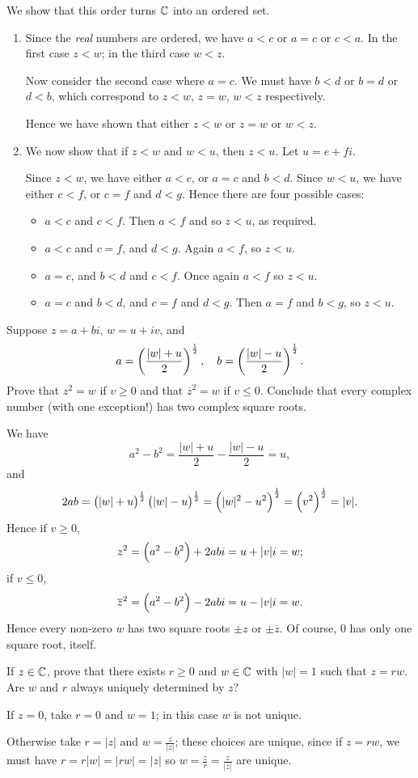 \begin{solution}
We show that this order turns $\mathbb C$ into an ordered set.
\begin{enumerate}[label=(\roman*)]
\item Since the \emph{real} numbers are ordered, we have $a<c$ or $a=c$ or $c<a$. In the first case $z<w$; in the third case $w<z$.

Now consider the second case where $a=c$. We must have $b<d$ or $b=d$ or $d<b$, which correspond to $z<w$, $z=w$, $w<z$ respectively.

Hence we have shown that either $z<w$ or $z=w$ or $w<z$.

\item We now show that if $z<w$ and $w<u$, then $z<u$. Let $u=e+fi$.

Since $z<w$, we have either $a<c$, or $a=c$ and $b<d$. Since $w<u$, we have either $c<f$, or $c=f$ and $d<g$. Hence there are four possible cases:
\begin{itemize}
\item $a<c$ and $c<f$. Then $a<f$ and so $z<u$, as required.
\item $a<c$ and $c=f$, and $d<g$. Again $a<f$, so $z<u$.
\item $a=c$, and $b<d$ and $c<f$. Once again $a<f$ so $z<u$.
\item $a=c$ and $b<d$, and $c=f$ and $d<g$. Then $a=f$ and $b<g$, so $z<u$.
\end{itemize}
\end{enumerate}
\end{solution}

\begin{exercise}
Suppose $z=a+bi$, $w=u+iv$, and
\[a=\left(\frac{|w|+u}{2}\right)^\frac{1}{2},\quad b=\left(\frac{|w|-u}{2}\right)^\frac{1}{2}.\]
Prove that $z^2=w$ if $v\ge0$ and that $\overline{z}^2=w$ if $v\le0$. Conclude that every complex number (with one exception!) has two complex square roots.
\end{exercise}

\begin{solution}
We have
\[a^2-b^2=\frac{|w|+u}{2}-\frac{|w|-u}{2}=u,\]
and
\[2ab=\left(|w|+u\right)^\frac{1}{2}\left(|w|-u\right)^\frac{1}{2}=\left(|w|^2-u^2\right)^\frac{1}{2}=\left(v^2\right)^\frac{1}{2}=|v|.\]
Hence if $v\ge0$,
\[z^2=\left(a^2-b^2\right)+2abi=u+|v|i=w;\]
if $v\le0$,
\[\overline{z}^2=\left(a^2-b^2\right)-2abi=u-|v|i=w.\]
Hence every non-zero $w$ has two square roots $\pm z$ or $\pm\overline{z}$. Of course, $0$ has only one square root, itself.
\end{solution}

\begin{exercise}
If $z\in\mathbb C$, prove that there exists $r\ge0$ and $w\in\mathbb C$ with $|w|=1$ such that $z=rw$. Are $w$ and $r$ always uniquely determined by $z$?
\end{exercise}

\begin{solution}
If $z=0$, take $r=0$ and $w=1$; in this case $w$ is not unique.

Otherwise take $r=|z|$ and $w=\frac{z}{|z|}$; these choices are unique, since if $z=rw$, we must have $r=r|w|=|rw|=|z|$ so $w=\frac{z}{r}=\frac{z}{|z|}$ are unique.
\end{solution}